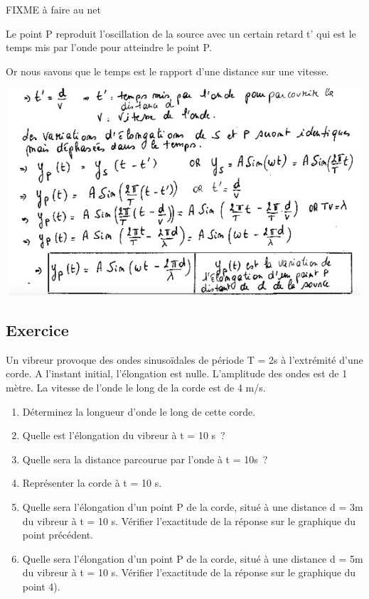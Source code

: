 FIXME à faire au net

Le point P reproduit l'oscillation de la source avec un certain retard
t' qui est le temps mis par l'onde pour atteindre le point P.

Or nous savons que le temps est le rapport d'une distance sur une
vitesse.

\includegraphics[width=14.152cm,height=7.717cm]{Pictures/100000010000039C0000022244D6A7EE40B9357C.png}

\subsection{Exercice}

Un vibreur provoque des ondes sinusoïdales de période T = 2s à
l'extrémité d'une corde. A l'instant initial, l'élongation est nulle.
L'amplitude des ondes est de 1 mètre. La vitesse de l'onde le long de la
corde est de 4 m/s.

\begin{enumerate}
\item  Déterminez la longueur d'onde le long de cette corde.
\item  Quelle est l'élongation du vibreur à t = 10 s~?
\item  Quelle sera la distance parcourue par l'onde à t = 10s~?
\item  Représenter la corde à t = 10 s.
\item  Quelle sera l'élongation d'un point P de la corde, situé à une
  distance d = 3m du vibreur à t = 10 s.
Vérifier l'exactitude de la réponse sur le graphique du point précédent.
\item  Quelle sera l'élongation d'un point P de la corde, situé à une
  distance d = 5m du vibreur à t = 10 s.
Vérifier l'exactitude de la réponse sur le graphique du point 4).
\end{enumerate}

